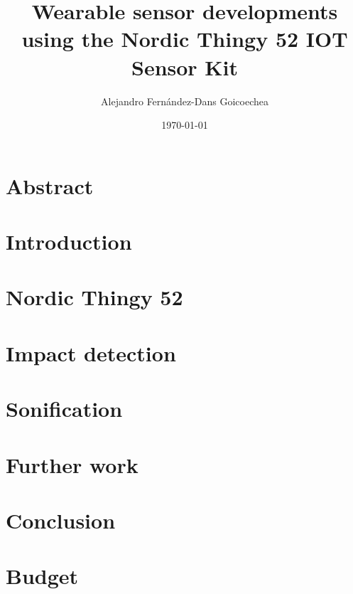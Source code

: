 \documentclass[a4paper, 11pt, twoside] {report}
\title{Wearable sensor developments using the Nordic Thingy 52 IOT Sensor Kit}
\author{Alejandro Fernández-Dans Goicoechea}
\date{\today}
\begin{document}
	
	\cleardoublepage

	\setforewordstyle
	
	\cleardoublepage

	\glsunsetall
	\chapter*{}
	
	\cleardoublepage

	\tableofcontents
	\cleardoublepage

	\listoffigures
	\cleardoublepage

	\listoftables
	\cleardoublepage
	\glsresetall

	\chapter*{Abstract}
	
	\cleardoublepage

	\setbodystyle

	\chapter{Introduction}
	
	\cleardoublepage

	\chapter{Nordic Thingy 52}
	
	\cleardoublepage

	\chapter{Impact detection}
	
	\cleardoublepage

	\chapter{Sonification}
	
	\cleardoublepage

	\chapter{Further work}
	\cleardoublepage

	\chapter{Conclusion}
	\cleardoublepage

	\chapter{Budget}
	
	\cleardoublepage

	\printbibliography
\end{document}
